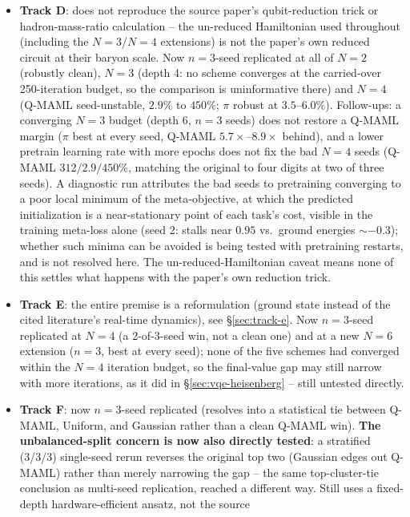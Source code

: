 \documentclass[11pt]{article}
\begin{document}
\begin{itemize}[nosep]
    seed noise does not reorder either direction's ranking.
    \item \textbf{Track D}: does not reproduce the source paper's qubit-reduction trick or hadron-mass-ratio
    calculation -- the un-reduced Hamiltonian used throughout (including the $N{=}3$/$N{=}4$ extensions) is
    not the paper's own reduced circuit at their baryon scale. Now $n{=}3$-seed replicated at all of
    $N{=}2$ (robustly clean), $N{=}3$ (depth 4: no scheme converges at the carried-over 250-iteration
    budget, so the comparison is uninformative there) and $N{=}4$ (Q-MAML seed-unstable, $2.9\%$ to
    $450\%$; $\pi$ robust at $3.5$--$6.0\%$). Follow-ups: a converging $N{=}3$ budget (depth 6, $n{=}3$
    seeds) does not restore a Q-MAML margin ($\pi$ best at every seed, Q-MAML $5.7\times$--$8.9\times$
    behind), and a lower pretrain learning rate with more epochs does not fix the bad $N{=}4$ seeds
    (Q-MAML $312/2.9/450\%$, matching the original to four digits at two of three seeds). A diagnostic run
    attributes the bad seeds to pretraining converging to a poor local minimum of the meta-objective, at
    which the predicted initialization is a near-stationary point of each task's cost, visible in the
    training meta-loss alone (seed 2: stalls near $0.95$ vs.\ ground energies $\sim-0.3$); whether such
    minima can be avoided is being tested with pretraining restarts, and is not resolved here. The un-reduced-Hamiltonian caveat means none of this
    settles what happens with the paper's own reduction trick.
    \item \textbf{Track E}: the entire premise is a reformulation (ground state instead of the cited
    literature's real-time dynamics), see \S\ref{sec:track-e}. Now $n{=}3$-seed replicated at $N{=}4$
    (a 2-of-3-seed win, not a clean one) and at a new $N{=}6$ extension ($n{=}3$, best at every seed); none of the
    five schemes had converged within the $N{=}4$ iteration budget, so the final-value gap may still narrow
    with more iterations, as it did in \S\ref{sec:vqe-heisenberg} -- still untested directly.
    \item \textbf{Track F}: now $n{=}3$-seed replicated (resolves into a statistical tie between Q-MAML,
    Uniform, and Gaussian rather than a clean Q-MAML win). \textbf{The unbalanced-split concern is now also
    directly tested}: a stratified (3/3/3) single-seed rerun reverses the original top two (Gaussian edges
    out Q-MAML) rather than merely narrowing the gap -- the same top-cluster-tie conclusion as multi-seed
    replication, reached a different way. Still uses a fixed-depth hardware-efficient ansatz, not the source

\end{itemize}
\end{document}
